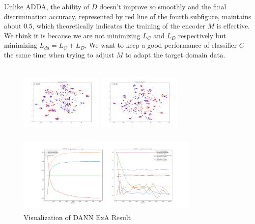\documentclass[conference]{IEEEtran}
\begin{document}
Unlike ADDA, the ability of $D$ doesn't improve so smoothly and the final discrimination accuracy, represented by red line of the fourth subfigure, maintains about $0.5$, which theoretically indicates the training of the encoder $M$ is effective. We think it is because we are not minimizing $L_C$ and $L_D$ respectively but minimizing $L_{da} = L_C+L_D$. We want to keep a good performance of classifier $C$ the same time when trying to adjust $M$ to adapt the target domain data.

\begin{figure}[htb]
\centering
\begin{minipage}[t]{0.26\textwidth}
\includegraphics[width=1.6in, height=1.5in]{Ldann/std_A2R/before.png}
\end{minipage}%
\begin{minipage}[t]{0.26\textwidth}
\includegraphics[width=1.6in, height=1.5in]{Ldann/std_A2R/after.png}
\end{minipage}%
\begin{minipage}[t]{0.45\textwidth}
\includegraphics[width=3.5in, height=1.5in]{Ldann/std_A2R/dann.png}
\end{minipage}%
\caption{Visualization of DANN ExA Result}\label{fig:ExA2}
\end{figure}
\end{document}
